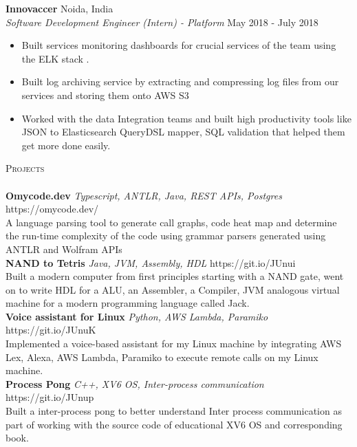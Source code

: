 \documentclass[a4paper]{article}
\newcommand{\lineunder} {
    \vspace*{-8pt} \\
    \hspace*{-18pt} \hrulefill \\
}
\newcommand{\header} [1] {
    {\hspace*{-18pt}\vspace*{6pt} \textsc{#1}}
    \vspace*{-6pt} \lineunder
}
\begin{document}
\textbf{Innovaccer} \hfill Noida, India\\
\textit{Software Development Engineer (Intern) - Platform} \hfill May 2018 - July 2018\\
\vspace{-1mm}
\begin{itemize} \itemsep 0.5pt
	\item Built services monitoring dashboards for crucial services of the team using the ELK stack .
	\item Built log archiving service by extracting and compressing log files from our services and storing them onto AWS S3
	\item Worked with the data Integration teams and built high productivity tools like JSON to Elasticsearch QueryDSL mapper, SQL validation that helped them get more done easily.
\end{itemize}


\header{Projects}
{\textbf{Omycode.dev}} {\sl Typescript, ANTLR, Java, REST APIs, Postgres} \hfill https://omycode.dev/\\
A language parsing tool to generate call graphs, code heat map and determine the run-time complexity of the code using grammar parsers generated using ANTLR and Wolfram APIs\\
\vspace*{2mm}
{\textbf{NAND to Tetris}} {\sl Java, JVM, Assembly, HDL} \hfill https://git.io/JUnui  \\
Built a modern computer from first principles starting with a NAND gate, went on to write HDL for a ALU, an Assembler, a Compiler, JVM analogous virtual machine for a modern programming language called Jack.\\
\vspace*{2mm}
{\textbf{Voice assistant for Linux}} {\sl Python, AWS Lambda, Paramiko} \hfill https://git.io/JUnuK\\
Implemented a voice-based assistant for my Linux machine by integrating AWS Lex, Alexa, AWS Lambda, Paramiko to execute remote calls on my Linux machine.\\
\vspace*{2mm}
{\textbf{Process Pong}} {\sl C++, XV6 OS, Inter-process communication} \hfill https://git.io/JUnup\\
Built a inter-process pong to better understand Inter process communication as part of working with the source code of educational XV6 OS and corresponding book.
\vspace*{2mm}
\end{document}
